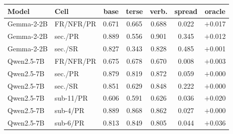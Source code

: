 \setlength{\tabcolsep}{2.6pt}
\renewcommand{\arraystretch}{1.05}
\scriptsize
\begin{tabular}{@{}llccccc@{}}
\toprule
\textbf{Model} & \textbf{Cell} & \textbf{base} & \textbf{terse} & \textbf{verb.} & \textbf{spread} & \textbf{oracle} \\
\midrule
Gemma-2-2B & FR/NFR/PR & 0.671 & 0.665 & 0.688 & 0.022 & $+$0.017 \\
Gemma-2-2B & sec./PR & 0.889 & 0.556 & 0.901 & 0.345 & $+$0.012 \\
Gemma-2-2B & sec./SR & 0.827 & 0.343 & 0.828 & 0.485 & $+$0.001 \\
Qwen2.5-7B & FR/NFR/PR & 0.675 & 0.678 & 0.670 & 0.008 & $+$0.003 \\
Qwen2.5-7B & sec./PR & 0.879 & 0.819 & 0.872 & 0.059 & $+$0.000 \\
Qwen2.5-7B & sec./SR & 0.851 & 0.629 & 0.848 & 0.222 & $+$0.000 \\
Qwen2.5-7B & sub-11/PR & 0.606 & 0.591 & 0.626 & 0.036 & $+$0.020 \\
Qwen2.5-7B & sub-4/PR & 0.889 & 0.868 & 0.862 & 0.027 & $+$0.000 \\
Qwen2.5-7B & sub-6/PR & 0.813 & 0.849 & 0.805 & 0.044 & $+$0.036 \\
\bottomrule
\end{tabular}
